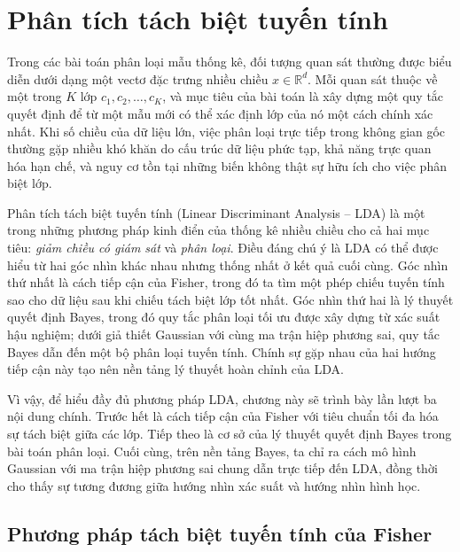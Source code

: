 \chapter{Phân tích tách biệt tuyến tính}

Trong các bài toán phân loại mẫu thống kê, đối tượng quan sát thường được biểu diễn dưới dạng một vectơ đặc trưng nhiều chiều $x \in \mathbb{R}^d$. Mỗi quan sát thuộc về một trong $K$ lớp $c_1,c_2,\ldots,c_K$, và mục tiêu của bài toán là xây dựng một quy tắc quyết định để từ một mẫu mới có thể xác định lớp của nó một cách chính xác nhất. Khi số chiều của dữ liệu lớn, việc phân loại trực tiếp trong không gian gốc thường gặp nhiều khó khăn do cấu trúc dữ liệu phức tạp, khả năng trực quan hóa hạn chế, và nguy cơ tồn tại những biến không thật sự hữu ích cho việc phân biệt lớp.

Phân tích tách biệt tuyến tính (Linear Discriminant Analysis -- LDA) là một trong những phương pháp kinh điển của thống kê nhiều chiều cho cả hai mục tiêu: \emph{giảm chiều có giám sát} và \emph{phân loại}. Điều đáng chú ý là LDA có thể được hiểu từ hai góc nhìn khác nhau nhưng thống nhất ở kết quả cuối cùng. Góc nhìn thứ nhất là cách tiếp cận của Fisher, trong đó ta tìm một phép chiếu tuyến tính sao cho dữ liệu sau khi chiếu tách biệt lớp tốt nhất. Góc nhìn thứ hai là lý thuyết quyết định Bayes, trong đó quy tắc phân loại tối ưu được xây dựng từ xác suất hậu nghiệm; dưới giả thiết Gaussian với cùng ma trận hiệp phương sai, quy tắc Bayes dẫn đến một bộ phân loại tuyến tính. Chính sự gặp nhau của hai hướng tiếp cận này tạo nên nền tảng lý thuyết hoàn chỉnh của LDA.

Vì vậy, để hiểu đầy đủ phương pháp LDA, chương này sẽ trình bày lần lượt ba nội dung chính. Trước hết là cách tiếp cận của Fisher với tiêu chuẩn tối đa hóa sự tách biệt giữa các lớp. Tiếp theo là cơ sở của lý thuyết quyết định Bayes trong bài toán phân loại. Cuối cùng, trên nền tảng Bayes, ta chỉ ra cách mô hình Gaussian với ma trận hiệp phương sai chung dẫn trực tiếp đến LDA, đồng thời cho thấy sự tương đương giữa hướng nhìn xác suất và hướng nhìn hình học.

\section{Phương pháp tách biệt tuyến tính của Fisher}

